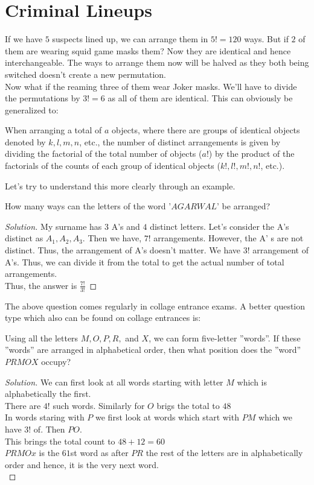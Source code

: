 \section{Criminal Lineups}
If we have $5$ suspects lined up, we can arrange them in $5!=120$ ways. But if $2$ of them are wearing squid game masks them? Now they are identical and hence interchangeable. The ways to arrange them now will be halved as they both being switched doesn't create a new permutation.\\
Now what if the reaming three of them wear Joker masks. We'll have to divide the permutations by $3!=6$ as all of them are identical. This can obviously be generalized to:
\begin{theorem}
When arranging a total of $a$ objects, where there are groups of identical objects denoted by $k, l, m, n$, etc., the number of distinct arrangements is given by dividing the factorial of the total number of objects ($a!$) by the product of the factorials of the counts of each group of identical objects ($k!, l!, m!, n!$, etc.).
\end{theorem}
Let's try to understand this more clearly through an example.
\begin{example}
    How many ways can the letters of the word '$AGARWAL$' be arranged?
\end{example}
\begin{proof}
    [Solution]
    My surname has $3$ A's and $4$ distinct letters. Let's consider the A's distinct as $A_1,A_2,A_3$. Then we have, $7!$ arrangements. However, the A' s are not distinct. Thus, the arrangement of A's doesn't matter. We have $3!$ arrangement of A's. Thus, we can divide it from the total to get the actual number of total arrangements.\\
    Thus, the answer is $\frac{7!}{3!}$
\end{proof}
The above question comes regularly in collage entrance exams. A better question type which also can be found on collage entrances is:
\begin{example}
    Using all the letters $M, O, P, R,$ and $X$, we can form five-letter ”words”. If these ”words” are arranged in alphabetical order, then what position does the ”word” $PRMOX$ occupy?
\end{example}
\begin{proof}
    [Solution]
    We can first look at all words starting with letter $M$ which is alphabetically the first.\\
    There are $4!$ such words. Similarly for $O$ brigs the total to $48$\\
    In words staring with $P$ we first look at words which start with $PM$ which we have $3!$ of. Then $PO$.\\
    This brings the total count to $48+12=60$\\
    $PRMOx$ is the $61$st word as after $PR$ the rest of the letters are in alphabetically order and hence, it is the very next word.\\
\end{proof}
